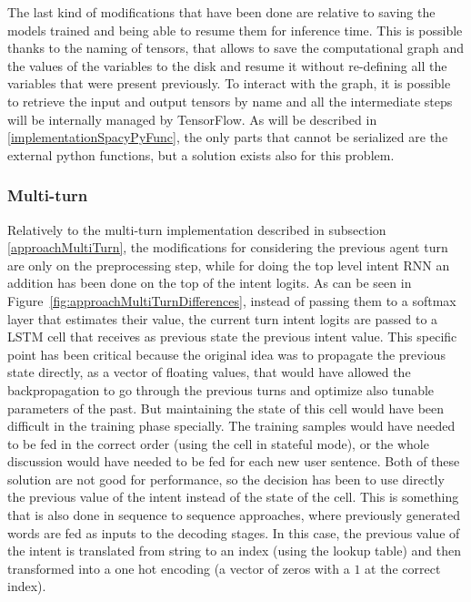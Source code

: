 The last kind of modifications that have been done are relative to saving the models trained and being able to resume them for inference time. This is possible thanks to the naming of tensors, that allows to save the computational graph and the values of the variables to the disk and resume it without re-defining all the variables that were present previously. To interact with the graph, it is possible to retrieve the input and output tensors by name and all the intermediate steps will be internally managed by TensorFlow. As will be described in \ref{implementationSpacyPyFunc}, the only parts that cannot be serialized are the external python functions, but a solution exists also for this problem.

\subsubsection{Multi-turn}
Relatively to the multi-turn implementation described in subsection \ref{approachMultiTurn}, the modifications for considering the previous agent turn are only on the preprocessing step, while for doing the top level intent RNN an addition has been done on the top of the intent logits. As can be seen in Figure~\ref{fig:approachMultiTurnDifferences}, instead of passing them to a softmax layer that estimates their value, the current turn intent logits are passed to a LSTM cell that receives as previous state the previous intent value. This specific point has been critical because the original idea was to propagate the previous state directly, as a vector of floating values, that would have allowed the backpropagation to go through the previous turns and optimize also tunable parameters of the past. But maintaining the state of this cell would have been difficult in the training phase specially. The training samples would have needed to be fed in the correct order (using the cell in stateful mode), or the whole discussion would have needed to be fed for each new user sentence. Both of these solution are not good for performance, so the decision has been to use directly the previous value of the intent instead of the state of the cell. This is something that is also done in sequence to sequence approaches, where previously generated words are fed as inputs to the decoding stages. In this case, the previous value of the intent is translated from string to an index (using the lookup table) and then transformed into a one hot encoding (a vector of zeros with a  \( 1 \) at the correct index).

